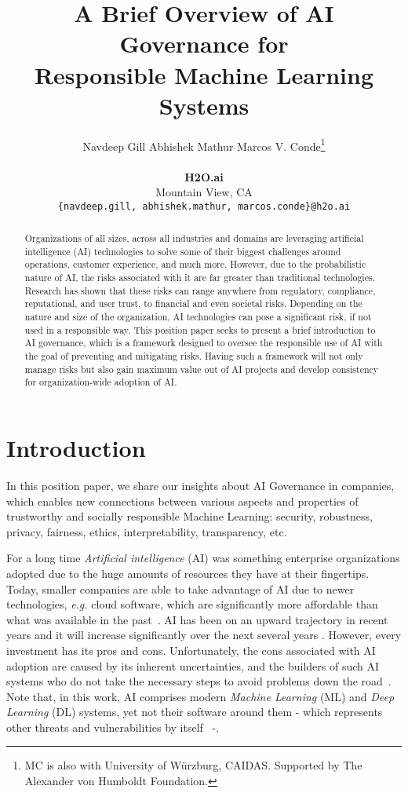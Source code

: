 \documentclass{article}
\title{A Brief Overview of AI Governance for\\Responsible Machine Learning Systems}
\author{
Navdeep Gill \quad Abhishek Mathur \quad Marcos V. Conde\thanks{MC is also with University of Würzburg, CAIDAS. Supported by The Alexander von Humboldt Foundation.}\\
\\
\textbf{H2O.ai}\\
Mountain View, CA\\
\texttt{\{navdeep.gill, abhishek.mathur, marcos.conde\}@h2o.ai} \\
}
\begin{document}
\maketitle


\begin{abstract}
Organizations of all sizes, across all industries and domains are leveraging artificial intelligence (AI) technologies to solve some of their biggest challenges around operations, customer experience, and much more. However, due to the probabilistic nature of AI, the risks associated with it are far greater than traditional technologies. Research has shown that these risks can range anywhere from regulatory, compliance, reputational, and user trust, to financial and even societal risks. Depending on the nature and size of the organization, AI technologies can pose a significant risk, if not used in a responsible way. This position paper seeks to present a brief introduction to AI governance, which is a framework designed to oversee the responsible use of AI with the goal of preventing and mitigating risks. Having such a framework will not only manage risks but also gain maximum value out of AI projects and develop consistency for organization-wide adoption of AI.

\end{abstract}

\section{Introduction}

In this position paper, we share our insights about AI Governance in companies, which enables new connections between various aspects and properties of trustworthy and socially responsible Machine Learning: security, robustness, privacy, fairness, ethics, interpretability, transparency, etc.

For a long time \emph{Artificial intelligence} (AI) was something enterprise organizations adopted due to the huge amounts of resources they have at their fingertips. Today, smaller companies are able to take advantage of AI due to newer technologies, \emph{e.g.} cloud software, which are significantly more affordable than what was available in the past~\cite{alsheibani2018artificial, cubric2020drivers, duan2019artificial, floridi2018ai4people}. AI has been on an upward trajectory in recent years and it will increase significantly over the next several years 
\cite{hbr} \cite{IBM} \cite{PwC}. 
However, every investment has its pros and cons. Unfortunately, the cons associated with AI adoption are caused by its inherent uncertainties, and the builders of such AI systems who do not take the necessary steps to avoid problems down the road~\cite{marr2018artificial, floridi2018ai4people}. Note that, in this work, AI comprises modern \emph{Machine Learning} (ML) and \emph{Deep Learning} (DL) systems, yet not their software around them - which represents other threats and vulnerabilities by itself~\cite{mcgraw2004software, alhazmi2007measuring, dowd2006art} -.
\end{document}
